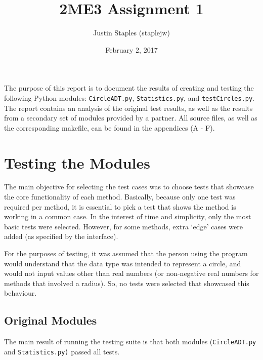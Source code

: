 \documentclass[12pt]{article}
\title{2ME3 Assignment 1}
\author{Justin Staples (staplejw)}
\date{February 2, 2017}
\begin{document}
\maketitle
\thispagestyle{empty}

\newpage

\tableofcontents

\thispagestyle{empty}

\newpage

\setcounter{page}{1}

The purpose of this report is to document the results of creating and testing the following Python modules: {\tt CircleADT.py}, {\tt Statistics.py}, and {\tt testCircles.py}. The report contains an analysis of the original test results, as well as the results from a secondary set of modules provided by a partner. All source files, as well as the corresponding makefile, can be found in the appendices (A - F).

\section{Testing the Modules}

The main objective for selecting the test cases was to choose tests that showcase the core functionality of each method. Basically, because only one test was required per method, it is essential to pick a test that shows the method is working in a common case. In the interest of time and simplicity, only the most basic tests were selected. However, for some methods, extra `edge' cases were added (as specified by the interface). 

For the purposes of testing, it was assumed that the person using the program would understand that the data type was intended to represent a circle, and would not input values other than real numbers (or non-negative real numbers for methods that involved a radius). So, no tests were selected that showcased this behaviour.

\subsection{Original Modules}

The main result of running the testing suite is that both modules ({\tt CircleADT.py} and {\tt Statistics.py)} passed all tests. 
\end{document}
